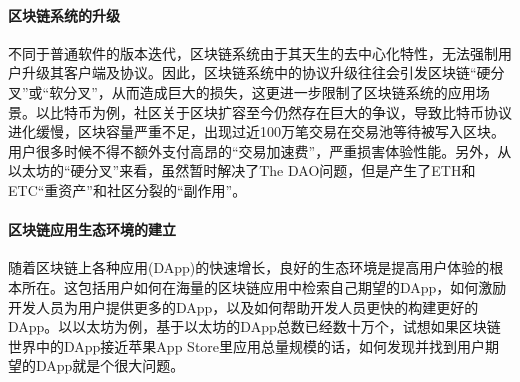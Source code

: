 \paragraph{区块链系统的升级}不同于普通软件的版本迭代，区块链系统由于其天生的去中心化特性，无法强制用户升级其客户端及协议。因此，区块链系统中的协议升级往往会引发区块链“硬分叉”或“软分叉”，从而造成巨大的损失，这更进一步限制了区块链系统的应用场景。以比特币为例，社区关于区块扩容至今仍然存在巨大的争议，导致比特币协议进化缓慢，区块容量严重不足，出现过近100万笔交易在交易池等待被写入区块。用户很多时候不得不额外支付高昂的“交易加速费”，严重损害体验性能。另外，从以太坊的“硬分叉”来看，虽然暂时解决了The
DAO问题，但是产生了ETH和ETC“重资产”和社区分裂的“副作用”。

\paragraph{区块链应用生态环境的建立}随着区块链上各种应用(DApp)的快速增长，良好的生态环境是提高用户体验的根本所在。这包括用户如何在海量的区块链应用中检索自己期望的DApp，如何激励开发人员为用户提供更多的DApp，以及如何帮助开发人员更快的构建更好的DApp。以以太坊为例，基于以太坊的DApp总数已经数十万个，试想如果区块链世界中的DApp接近苹果App Store里应用总量规模的话，如何发现并找到用户期望的DApp就是个很大问题。


